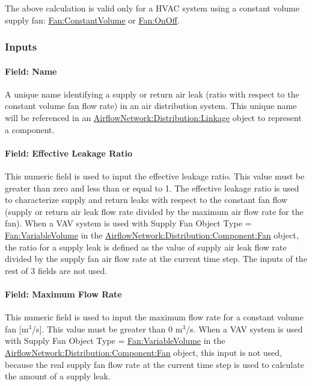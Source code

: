 The above calculation is valid only for a HVAC system using a constant volume supply fan: \hyperref[fanconstantvolume]{Fan:ConstantVolume} or \hyperref[fanonoff]{Fan:OnOff}.

\subsubsection{Inputs}\label{inputs-14-001}

\paragraph{Field: Name}\label{field-name-16-000}

A unique name identifying a supply or return air leak (ratio with respect to the constant volume fan flow rate) in an air distribution system. This unique name will be referenced in an \hyperref[airflownetworkdistributionlinkage]{AirflowNetwork:Distribution:Linkage} object to represent a component.

\paragraph{Field: Effective Leakage Ratio}\label{field-effective-leakage-ratio}

This numeric field is used to input the effective leakage ratio. This value must be greater than zero and less than or equal to 1. The effective leakage ratio is used to characterize supply and return leaks with respect to the constant fan flow (supply or return air leak flow rate divided by the maximum air flow rate for the fan). When a VAV system is used with Supply Fan Object Type = \hyperref[fanvariablevolume]{Fan:VariableVolume} in the \hyperref[airflownetworkdistributioncomponentfan]{AirflowNetwork:Distribution:Component:Fan} object, the ratio for a supply leak is defined as the value of supply air leak flow rate divided by the supply fan air flow rate at the current time step. The inputs of the rest of 3 fields are not used.

\paragraph{Field: Maximum Flow Rate}\label{field-maximum-flow-rate}

This numeric field is used to input the maximum flow rate for a constant volume fan {[}m\(^{3}\)/s{]}. This value must be greater than 0 m\(^{3}\)/s. When a VAV system is used with Supply Fan Object Type = \hyperref[fanvariablevolume]{Fan:VariableVolume} in the \hyperref[airflownetworkdistributioncomponentfan]{AirflowNetwork:Distribution:Component:Fan} object, this input is not used, because the real supply fan flow rate at the current time step is used to calculate the amount of a supply leak.

